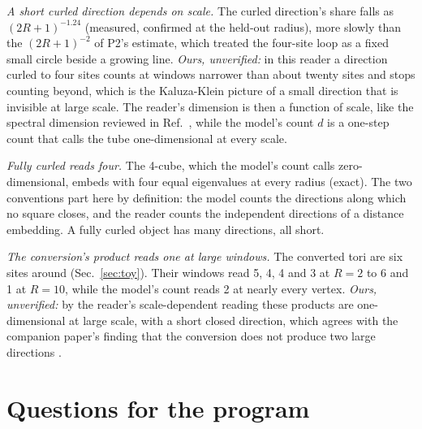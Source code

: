 \documentclass[aps,pre,10pt,twocolumn,superscriptaddress,nofootinbib]{revtex4-2}
\begin{document}
\emph{A short curled direction depends on scale.} The curled direction's share falls as $(2R+1)^{-1.24}$ (measured,
confirmed at the held-out radius), more slowly than the $(2R+1)^{-2}$ of P2's estimate, which treated the four-site
loop as a fixed small circle beside a growing line. \emph{Ours, unverified:} in this reader a direction curled to
four sites counts at windows narrower than about twenty sites and stops counting beyond, which is the Kaluza-Klein
picture of a small direction that is invisible at large scale. The reader's dimension is then a function of scale,
like the spectral dimension reviewed in Ref.~\cite{Carlip17}, while the model's count $d$ is a one-step count that
calls the tube one-dimensional at every scale.

\emph{Fully curled reads four.} The 4-cube, which the model's count calls zero-dimensional, embeds with four equal
eigenvalues at every radius (exact). The two conventions part here by definition: the model counts the directions
along which no square closes, and the reader counts the independent directions of a distance embedding. A fully
curled object has many directions, all short.

\emph{The conversion's product reads one at large windows.} The converted tori are six sites around (Sec.~\ref{sec:toy}).
Their windows read 5, 4, 4 and 3 at $R=2$ to 6 and 1 at $R=10$, while the model's count reads 2 at nearly every
vertex. \emph{Ours, unverified:} by the reader's scale-dependent reading these products are one-dimensional at large
scale, with a short closed direction, which agrees with the companion paper's finding that the conversion does not
produce two large directions \cite{paper1}.

\section{Questions for the program}
\label{sec:questions}
\end{document}
